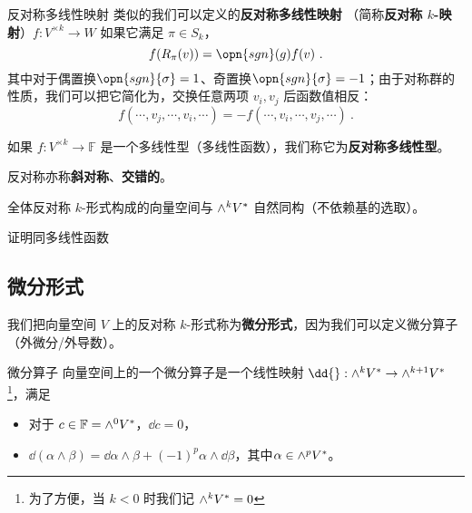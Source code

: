 \begin{definition}{反对称多线性映射}\label{def_SASmap_1}
类似的我们可以定义的\textbf{反对称多线性映射} （简称\textbf{反对称 $k$-映射}）$f: V^{\times k} \to W$ 如果它满足 $\pi \in S_k$，
\begin{equation}
f(R_\pi(v)) = \opn{sgn}(g) f(v)~.
\end{equation}
其中对于偶置换$\opn{sgn}{\sigma} = 1$、奇置换$\opn{sgn}{\sigma} = -1$；由于对称群的性质，我们可以把它简化为，交换任意两项 $v_i, v_j$ 后函数值相反：
\begin{equation}
f(\cdots, v_j, \cdots, v_i, \cdots) = - f(\cdots, v_i, \cdots, v_j, \cdots)~.
\end{equation}

如果 $f: V^{\times k} \to \mathbb{F}$ 是一个多线性型（多线性函数），我们称它为\textbf{反对称多线性型}。

反对称亦称\textbf{斜对称}、\textbf{交错的}。
\end{definition}


\begin{theorem}{}
全体反对称 $k$-形式构成的向量空间与 ${\large \wedge}^k V^*$ 自然同构（不依赖基的选取）。
\end{theorem}
证明同多线性函数


\subsection{微分形式}

我们把向量空间 $V$ 上的反对称 $k$-形式称为\textbf{微分形式}，因为我们可以定义微分算子（外微分/外导数）。

\begin{definition}{微分算子}
向量空间上的一个微分算子是一个线性映射 $\dd{} : {\large \wedge}^k V^* \to {\large \wedge}^{k + 1} V^*$\footnote{为了方便，当 $k < 0$ 时我们记 ${\large \wedge}^k V^* = 0$}，满足
\begin{itemize}
\item 对于 $c \in \mathbb{F} = {\large \wedge}^0 V^*$，$\dd c = 0$，
\item $\dd(\alpha \wedge \beta) = \dd\alpha \wedge \beta + (-1)^p \alpha \wedge \dd\beta$，其中$\alpha \in {\large \wedge}^p V^*$。
\end{itemize}


\end{definition}


